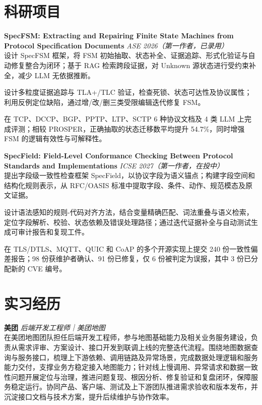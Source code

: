 \documentclass{resume}
\begin{document}
\section*{科研项目}
\noindent
\textbf{SpecFSM: Extracting and Repairing Finite State Machines from} \\
\textbf{Protocol Specification Documents} \hfill \textit{ASE 2026（第一作者，已录用）} \\
\noindent 设计 SpecFSM 框架，将 FSM 初始抽取、状态补全、证据追踪、形式化验证与自动修复整合为闭环；基于 RAG 检索跨段证据，对 Unknown 源状态进行受约束补全，减少 LLM 无依据推断。\par
\noindent 设计多粒度证据追踪与 TLA+/TLC 验证，检查死锁、状态可达性及协议属性；利用反例定位缺陷，通过增/改/删三类受限编辑迭代修复 FSM。\par
\noindent 在 TCP、DCCP、BGP、PPTP、LTP、SCTP 6 种协议文档及 4 类 LLM 上完成评测；相较 PROSPER，正确抽取的状态迁移数平均提升 54.7\%，同时增强 FSM 的逻辑有效性与可解释性。\par

\noindent
\textbf{SpecField: Field-Level Conformance Checking Between Protocol} \\
\textbf{Standards and Implementations} \hfill \textit{ICSE 2027（第一作者，在投中）} \\
\noindent 提出字段级一致性检查框架 SpecField，以协议字段为语义锚点；构建字段空间和结构化规则表示，从 RFC/OASIS 标准中提取字段、条件、动作、规范模态及原文证据。\par
\noindent 设计语法感知的规则-代码对齐方法，结合变量精确匹配、词法重叠与语义检索，定位字段解析、校验、状态依赖及错误处理路径；通过迭代证据补全与自动测试生成可审计报告和复现工件。\par
\noindent 在 TLS/DTLS、MQTT、QUIC 和 CoAP 的多个开源实现上提交 240 份一致性偏差报告；98 份获维护者确认、91 份已修复，仅 6 份被判定为误报，其中 3 份已分配新的 CVE 编号。\par


\section{实习经历}
\noindent
\textbf{美团} \hfill \textit{后端开发工程师｜美团地图} \\
\noindent 在美团地图团队担任后端开发工程师，参与地图基础能力及相关业务服务建设，负责从需求评审、方案设计、接口开发到联调上线的完整迭代流程。围绕地图数据查询与服务接口，梳理上下游依赖、调用链路及异常场景，完成数据处理逻辑和服务能力交付，支撑业务方稳定接入地图能力；针对线上慢调用、异常请求和数据一致性问题开展定位与治理，推进问题复现、根因分析、修复验证和复盘闭环，保障服务稳定运行。协同产品、客户端、测试及上下游团队推进需求验收和版本发布，并沉淀接口文档与技术方案，提升后续维护与协作效率。
\end{document}
